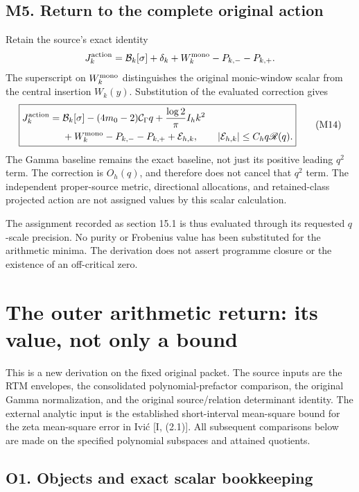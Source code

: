 \documentclass[11pt,a4paper]{article}
\begin{document}
\subsection{M5. Return to the complete original
action}\label{sa:m5.-return-to-the-complete-original-action}

Retain the source's exact identity \[
J_k^{\rm action}=\mathcal B_k[\sigma]+\delta_k
+W_k^{\rm mono}-P_{k,-}-P_{k,+}.
\] The superscript on \(W_k^{\rm mono}\) distinguishes the original
monic-window scalar from the central insertion \(W_k(y)\). Substitution
of the evaluated correction gives \[
\boxed{\begin{aligned}
J_k^{\rm action}={}&\mathcal B_k[\sigma]
-(4m_0-2)\mathcal C_\Gamma q
+\frac{\log2}{\pi}I_hk^2\\
&+W_k^{\rm mono}-P_{k,-}-P_{k,+}
+\mathcal E_{h,k},
\qquad |\mathcal E_{h,k}|\le C_hq\mathscr R(q).
\end{aligned}}\tag{M14}
\] The Gamma baseline remains the exact baseline, not just its positive
leading \(q^2\) term. The correction is \(O_h(q)\), and therefore does
not cancel that \(q^2\) term. The independent proper-source metric,
directional allocations, and retained-class projected action are not
assigned values by this scalar calculation.

The assignment recorded as section 15.1 is thus evaluated through its
requested \(q\)-scale precision. No purity or Frobenius value has been
substituted for the arithmetic minima. The derivation does not assert
programme closure or the existence of an off-critical zero.

\newpage

\section{The outer arithmetic return: its value, not only a
bound}\label{sa:the-outer-arithmetic-return-its-value-not-only-a-bound}

This is a new derivation on the fixed original packet. The source inputs
are the RTM envelopes, the consolidated polynomial-prefactor comparison,
the original Gamma normalization, and the original source/relation
determinant identity. The external analytic input is the established
short-interval mean-square bound for the zeta mean-square error in Ivić
{[}I, (2.1){]}. All subsequent comparisons below are made on the
specified polynomial subspaces and attained quotients.

\subsection{O1. Objects and exact scalar
bookkeeping}\label{sa:o1.-objects-and-exact-scalar-bookkeeping}
\end{document}
